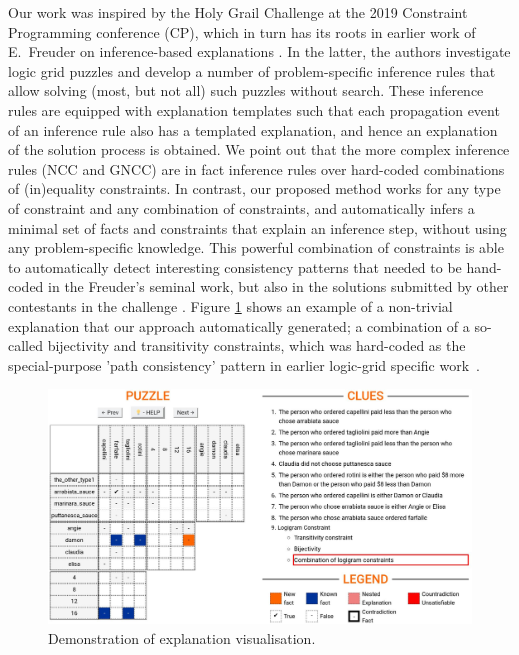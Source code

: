 Our work was inspired by the Holy Grail Challenge \cite{freuder2018progress} at the 2019 Constraint Programming conference (CP), which in turn has its roots in earlier work of E.~Freuder on inference-based explanations \cite{sqalli1996inference}.
In the latter, the authors investigate logic grid puzzles and develop a number of problem-specific inference rules that allow solving (most, but not all) such puzzles without search.
These inference rules are equipped with explanation templates such that each propagation event of an inference rule also has a templated explanation, and hence an explanation of the solution process is obtained.
We point out that the more complex inference rules (NCC and GNCC) are in fact inference rules over hard-coded combinations of (in)equality constraints.
In contrast, our proposed method works for any type of constraint and any combination of constraints, and automatically infers a minimal set of facts and constraints that explain an inference step, without using any problem-specific knowledge.
This powerful combination of constraints is able to automatically detect interesting consistency patterns that needed to be hand-coded in the Freuder's seminal work, but also in the solutions submitted by other
contestants in the challenge \cite{escamocher2019solving}.
Figure \ref{fig:zebrascreen:path} shows an example of a non-trivial explanation that our approach automatically generated; a combination of a so-called bijectivity and transitivity constraints, which was hard-coded as the special-purpose 'path consistency' pattern in earlier logic-grid specific work~\cite{sqalli1996inference}.

\begin{figure}[ht]
    \centering
    \includegraphics[width=\textwidth]{figures/related_work.jpeg}
    \caption{Demonstration of explanation visualisation.}
    \label{fig:zebrascreen:path}
\end{figure}


